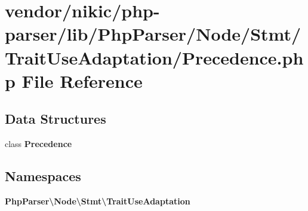 \section{vendor/nikic/php-\/parser/lib/\+Php\+Parser/\+Node/\+Stmt/\+Trait\+Use\+Adaptation/\+Precedence.php File Reference}
\label{_precedence_8php}
\subsection*{Data Structures}
\begin{DoxyCompactItemize}
\item 
class {\bf Precedence}
\end{DoxyCompactItemize}
\subsection*{Namespaces}
\begin{DoxyCompactItemize}
\item 
 {\bf Php\+Parser\textbackslash{}\+Node\textbackslash{}\+Stmt\textbackslash{}\+Trait\+Use\+Adaptation}
\end{DoxyCompactItemize}
